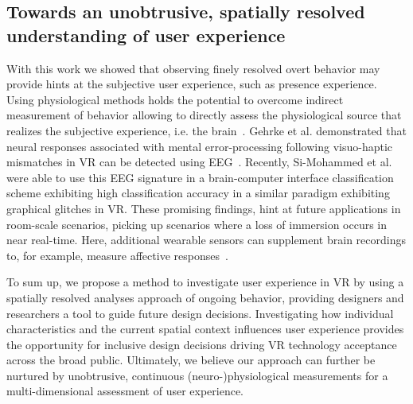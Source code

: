 \subsection{Towards an unobtrusive, spatially resolved understanding of user experience}
With this work we showed that observing finely resolved overt behavior may provide hints at the subjective user experience, such as presence experience. Using physiological methods holds the potential to overcome indirect measurement of behavior allowing to directly assess the physiological source that realizes the subjective experience, i.e. the brain~\cite{Gehrke2019, Singh2018, Si-mohammed2020}. Gehrke et al. demonstrated that neural responses associated with mental error-processing following visuo-haptic mismatches in VR can be detected using EEG~\cite{Gehrke2019}. Recently, Si-Mohammed et al. were able to use this EEG signature in a brain-computer interface classification scheme exhibiting high classification accuracy in a similar paradigm exhibiting graphical glitches in VR. These promising findings, hint at future applications in room-scale scenarios, picking up scenarios where a loss of immersion occurs in near real-time. Here, additional wearable sensors can supplement brain recordings to, for example, measure affective responses~\cite{Marin-Morales2018}.

To sum up, we propose a method to investigate user experience in VR by using a spatially resolved analyses approach of ongoing behavior, providing designers and researchers a tool to guide future design decisions. Investigating how individual characteristics and the current spatial context influences user experience provides the opportunity for inclusive design decisions driving VR technology acceptance across the broad public. Ultimately, we believe our approach can further be nurtured by unobtrusive, continuous (neuro-)physiological measurements for a multi-dimensional assessment of user experience.